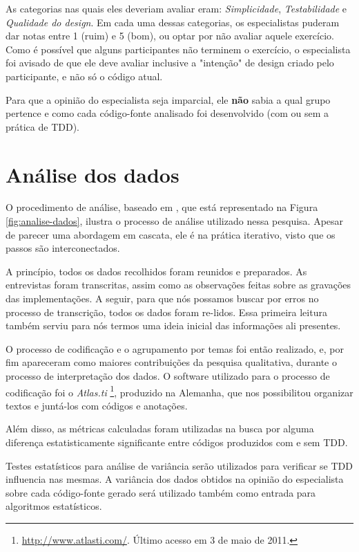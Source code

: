 As categorias nas quais eles deveriam avaliar eram: \textit{Simplicidade}, \textit{Testabilidade} e
\textit{Qualidade do design}.
Em cada uma dessas categorias, os especialistas puderam dar notas entre
1 (ruim) e 5 (bom), ou optar por não avaliar aquele exercício.
Como é possível que alguns participantes não terminem o exercício, o especialista
foi avisado de que ele deve avaliar inclusive a "intenção" de design criado
pelo participante, e não só o código atual. 

Para que a opinião do especialista seja imparcial, ele \textbf{não} sabia a qual grupo
pertence e como cada código-fonte analisado foi desenvolvido (com ou sem a prática de TDD).

\section{Análise dos dados}
\label{sec:planejamento-analise}

O procedimento de análise, baseado em \cite{creswell}, que está representado na
Figura \ref{fig:analise-dados}, ilustra o processo de análise utilizado
nessa pesquisa. Apesar de parecer uma abordagem em cascata, ele é na prática 
iterativo, visto que os passos são interconectados. 

A princípio, todos os dados recolhidos foram reunidos e preparados. As entrevistas
foram transcritas, assim como as observações feitas sobre as gravações das implementações.
A seguir, para que nós possamos buscar por erros no processo de transcrição, todos
os dados foram re-lidos. Essa primeira leitura também serviu para nós termos
uma ideia inicial das informações ali presentes.

O processo de codificação e o agrupamento
por temas foi então realizado, e, por fim apareceram como maiores
contribuições da pesquisa qualitativa, durante o processo de interpretação dos
dados. O software utilizado para o processo de codificação foi
o \textit{Atlas.ti} \footnote{\url{http://www.atlasti.com/}. Último acesso em 3
de maio de 2011.}, produzido na Alemanha, que nos possibilitou 
organizar textos e juntá-los com códigos e anotações. 

Além disso, as métricas calculadas foram utilizadas na busca por alguma diferença
estatisticamente significante entre códigos produzidos com e sem TDD.
 
Testes estatísticos para análise de variância serão utilizados
para verificar se TDD influencia nas mesmas.
A variância dos dados obtidos na opinião do especialista sobre cada código-fonte gerado
será utilizado também como entrada para algoritmos estatísticos. 

